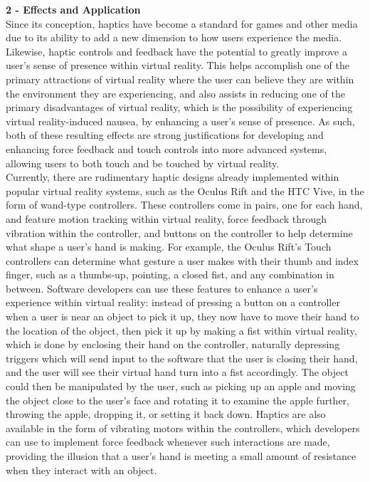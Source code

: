 \documentclass{article}
\begin{document}
\textbf{2 - Effects and Application} \\
Since its conception, haptics have become a standard for games and other media due to its ability to add a new dimension to how users experience the media. Likewise, haptic controls and feedback have the potential to greatly improve a user's sense of presence within virtual reality. This helps accomplish one of the primary attractions of virtual reality where the user can believe they are within the environment they are experiencing, and also assists in reducing one of the primary disadvantages of virtual reality, which is the possibility of experiencing virtual reality-induced nausea, by enhancing a user's sense of presence. As such, both of these resulting effects are strong justifications for developing and enhancing force feedback and touch controls into more advanced systems, allowing users to both touch and be touched by virtual reality. \\
Currently, there are rudimentary haptic designs already implemented within popular virtual reality systems, such as the Oculus Rift\cite{article1cite} and the HTC Vive\cite{article2cite}, in the form of wand-type controllers. These controllers come in pairs, one for each hand, and feature motion tracking within virtual reality, force feedback through vibration within the controller, and buttons on the controller to help determine what shape a user's hand is making. For example, the Oculus Rift's Touch controllers can determine what gesture a user makes with their thumb and index finger, such as a thumbs-up, pointing, a closed fist, and any combination in between\cite{article1cite}. Software developers can use these features to enhance a user's experience within virtual reality: instead of pressing a button on a controller when a user is near an object to pick it up, they now have to move their hand to the location of the object, then pick it up by making a fist within virtual reality, which is done by enclosing their hand on the controller, naturally depressing triggers which will send input to the software that the user is closing their hand, and the user will see their virtual hand turn into a fist accordingly. The object could then be manipulated by the user, such as picking up an apple and moving the object close to the user's face and rotating it to examine the apple further, throwing the apple, dropping it, or setting it back down. Haptics are also available in the form of vibrating motors within the controllers, which developers can use to implement force feedback whenever such interactions are made, providing the illusion that a user's hand is meeting a small amount of resistance when they interact with an object. \\
\end{document}
